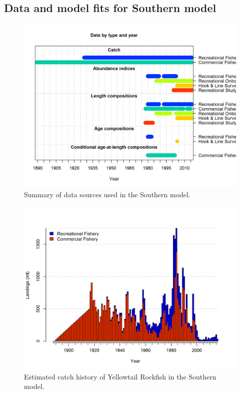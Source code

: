 \documentclass[12pt,]{article}
\begin{document}
\FloatBarrier

\newpage

\subsection{Data and model fits for Southern
model}\label{data-and-model-fits-for-southern-model}

\begin{figure}[htbp]
\centering
\includegraphics{r4ss/plots_mod2/data_plot.png}
\caption{Summary of data sources used in the Southern model.
\label{fig:data_plot.S}}
\end{figure}

\FloatBarrier

\newpage

\begin{figure}[htbp]
\centering
\includegraphics{./tex2pdf.8516/59e7430368fa3ab4a2073f82708e5c840614580b.png}
\caption{Estimated catch history of Yellowtail Rockfish in the Southern
model. \label{fig:r4ss_catch2_S}}
\end{figure}
\end{document}
